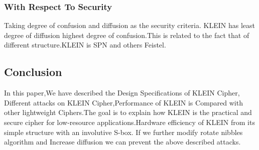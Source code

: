 \documentclass[preprint]{transcrypto}
\begin{document}
\subsubsection{With Respect To Security}
Taking degree of confusion and diffusion as the security criteria. KLEIN has least degree of diffusion
highest degree of confusion.This is related to the fact that of different structure.KLEIN is SPN and others  Feistel.


\subsection{Conclusion}
In this paper,We have described the Design Specifications of KLEIN Cipher, Different attacks on KLEIN Cipher,Performance of KLEIN is Compared with other lightweight Ciphers.The goal is to explain how KLEIN is the practical and secure cipher for low-resource applications.Hardware efficiency of KLEIN from its simple structure with an involutive S-box. If we further modify rotate nibbles algorithm and Increase diffusion we can prevent the above described attacks.\\




\printbibliography

\end{document}
